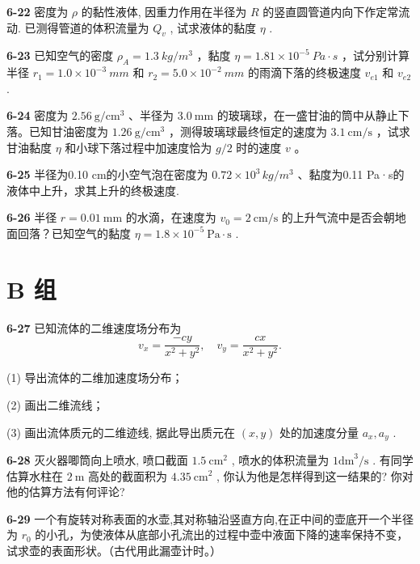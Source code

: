 \textbf{6-22} 密度为 $\rho$ 的黏性液体, 因重力作用在半径为 $R$ 的竖直圆管道内向下作定常流动. 已测得管道的体积流量为 $Q_{v}$ , 试求液体的黏度 $\eta$ .

\newpage

\textbf{6-23} 已知空气的密度 $\rho_{A}=1.3\ kg/m^{3}$ ，黏度 $\eta=1.81\times10^{-5}\ Pa\cdot s$ ，试分别计算半径 $r_{1}=1.0\times10^{-3}\ mm$ 和 $r_{2}=5.0\times10^{-2}\ mm$ 的雨滴下落的终极速度 $v_{e1}$ 和 $v_{e2}$ .

\newpage

\textbf{6-24} 密度为 $2.56 \mathrm{~g} / \mathrm{cm}^{3}$ 、半径为 $3.0 \mathrm{~mm}$ 的玻璃球，在一盛甘油的筒中从静止下落。已知甘油密度为 $1.26 \mathrm{~g} / \mathrm{cm}^{3}$ ，测得玻璃球最终恒定的速度为 $3.1 \mathrm{~cm} / \mathrm{s}$ ，试求甘油黏度 $\eta$ 和小球下落过程中加速度恰为 $g / 2$ 时的速度 $v$ 。

\newpage

\textbf{6-25} 半径为0.10 cm的小空气泡在密度为 $0.72 \times 10^{3} \, kg/m^{3}$ 、黏度为0.11 Pa·s的液体中上升，求其上升的终极速度.

\newpage

\textbf{6-26} 半径 $r = 0.01 \mathrm{~mm}$ 的水滴，在速度为 $v_{0} = 2 \mathrm{~cm} / \mathrm{s}$ 的上升气流中是否会朝地面回落？已知空气的黏度 $\eta = 1.8 \times 10^{-5} \mathrm{~Pa} \cdot \mathrm{s}$ .


\newpage

\section*{B 组}
\vspace{0.3cm}
\textbf{6-27} 已知流体的二维速度场分布为
\[
v _ {x} = \frac {- c y}{x ^ {2} + y ^ {2}}, \quad v _ {y} = \frac {c x}{x ^ {2} + y ^ {2}}.
\]

(1) 导出流体的二维加速度场分布；

(2) 画出二维流线；

(3) 画出流体质元的二维迹线, 据此导出质元在 $(x, y)$ 处的加速度分量 $a_x, a_y$ .

\newpage

\textbf{6-28} 灭火器唧筒向上喷水, 喷口截面 $1.5 \mathrm{~cm}^{2}$ , 喷水的体积流量为 $1 \mathrm{dm}^{3} / \mathrm{s}$ . 有同学估算水柱在 $2 \mathrm{~m}$ 高处的截面积为 $4.35 \mathrm{~cm}^{2}$ , 你认为他是怎样得到这一结果的? 你对他的估算方法有何评论?

\newpage

\textbf{6-29} 一个有旋转对称表面的水壶,其对称轴沿竖直方向,在正中间的壶底开一个半径为 $r_{0}$ 的小孔，为使液体从底部小孔流出的过程中壶中液面下降的速率保持不变，试求壶的表面形状。（古代用此漏壶计时。）

